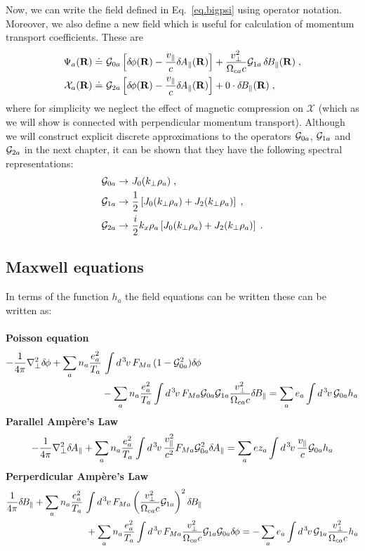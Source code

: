 Now, we can write the field defined in Eq.~\ref{eq.bigpsi} using operator 
notation.  Moreover, we also define a new field which is useful for 
calculation of momentum transport coefficients.  These are
%
\begin{align}
\Psi_a(\mathbf{R}) \doteq &~{\cal G}_{0a} \left[ \delta \hskip -1pt \phi(\mathbf{R}) - \frac{v_\parallel}{c} \delta \hskip -1pt A_\parallel(\mathbf{R}) \right]
 + \frac{v_\perp^2}{\Omega_{ca} c} {\cal G}_{1a} \, \delta \hskip -1pt B_\parallel(\mathbf{R}) \; , \\
\mathcal{X}_a(\mathbf{R}) \doteq &~{\cal G}_{2a} \left[ \delta \hskip -1pt \phi(\mathbf{R}) - \frac{v_\parallel}{c} \delta \hskip -1pt A_\parallel(\mathbf{R}) \right]
 + 0 \cdot\delta \hskip -1pt B_\parallel(\mathbf{R}) \; , 
\end{align}
%
where for simplicity we neglect the effect of magnetic compression
on $\mathcal{X}$ (which as we will show is connected with perpendicular 
momentum transport).  Although we will construct explicit discrete 
approximations to the operators ${\cal G}_{0a}$, ${\cal G}_{1a}$ and ${\cal G}_{2a}$
in the next chapter, it can be shown that they have the following 
spectral representations:
%
\begin{align}
{\cal G}_{0a} \rightarrow &~J_0(k_\perp \rho_a) \; , \\
{\cal G}_{1a} \rightarrow &~\frac{1}{2} \left[ 
  J_0(k_\perp \rho_a) + J_2(k_\perp \rho_a) \right] \; , \\
{\cal G}_{2a} \rightarrow &~\frac{i}{2} k_x \rho_a \left[ 
  J_0(k_\perp \rho_a) + J_2(k_\perp \rho_a) \right] \; .
\end{align}

\subsection{Maxwell equations}

In terms of the function $h_a$ the field equations can be written
these can be written as:\\
\\
%
{\bf Poisson equation}
%
\begin{align}
-\frac{1}{4 \pi} \nabla_\perp^2 \delta \hskip -1pt \phi 
+ \sum_a n_a \frac{e_a^2}{T_a} & \, \int d^{\hskip 1pt 3} \hskip -1pt v \, F_{Ma} \, (1-{\cal G}_{0a}^2) \delta \hskip -1pt \phi 
\nonumber \\
& - \sum_a n_a \frac{e_a^2}{T_a} \int d^{\hskip 1pt 3} \hskip -1pt v \, F_{Ma} {\cal G}_{0a} {\cal G}_{1a}
  \frac{v_\perp^2}{\Omega_{ca} c} \delta \hskip -1pt B_\parallel 
= \sum_a e_a \int d^{\hskip 1pt 3} \hskip -1pt v \, {\cal G}_{0a} h_a 
 \label{eq.maxp}
\end{align}
%
{\bf Parallel Amp\`ere's Law}
%
\begin{equation}
-\frac{1}{4 \pi} \nabla_\perp^2 \delta \hskip -1pt A_\parallel 
+ \sum_a n_a \frac{e_a^2}{T_a} \int d^{\hskip 1pt 3} \hskip -1pt v \, \frac{v_\parallel^2}{c^2} F_{Ma} {\cal G}_{0a}^2 \delta \hskip -1pt A_\parallel
= \sum_a e z_a \int d^{\hskip 1pt 3} \hskip -1pt v \, \frac{v_\parallel}{c} {\cal G}_{0a} h_a 
 \label{eq.maxa1}
\end{equation}
%
{\bf Perperdicular Amp\`ere's Law}
%
\begin{align}
\frac{1}{4 \pi} \delta \hskip -1pt B_\parallel + \sum_a n_a \frac{e_a^2}{T_a} & \, \int d^{\hskip 1pt 3} \hskip -1pt v \, F_{Ma} 
\left( \frac{v_\perp^2}{\Omega_{ca} c} {\cal G}_{1a} \right)^2 \delta \hskip -1pt B_\parallel
\nonumber \\
&~ + \sum_a n_a \frac{e_a^2}{T_a} \int d^{\hskip 1pt 3} \hskip -1pt v \, F_{Ma} 
\frac{v_\perp^2}{\Omega_{ca} c} {\cal G}_{1a} {\cal G}_{0a} \delta \hskip -1pt \phi
= -\sum_a e_a \int d^{\hskip 1pt 3} \hskip -1pt v \, {\cal G}_{1a} \frac{v_\perp^2}{\Omega_{ca} c} h_a 
 \label{eq.maxa2}
\end{align}
%
